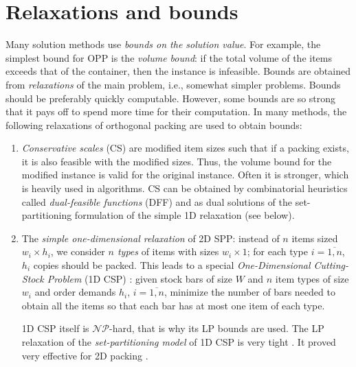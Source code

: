 \documentclass[a4paper,12pt]{article}
\begin{document}
\section{Relaxations and bounds}

Many solution methods use \emph{bounds on the solution value}. For example, the simplest bound for OPP is the \emph{volume bound}: if the total volume of the items exceeds that of the container, then the instance is infeasible.   Bounds are obtained from \emph{relaxations} of the main problem, i.e., somewhat simpler problems. Bounds should be preferably quickly computable. However, some bounds are so strong that it pays off to spend more time for their computation. In many methods, the following relaxations of orthogonal packing are used to obtain bounds:

\begin{enumerate}
\item \emph{Conservative scales} (CS) \cite{FekBnd} are modified item sizes such that if a packing exists, it is also feasible with the modified sizes. Thus, the volume bound for the modified instance is valid for the original instance. Often it is stronger, which is heavily used in algorithms. CS can be obtained by combinatorial heuristics called \emph{dual-feasible functions} (DFF) \cite{FekBnd,ClaDFFSurvey} and as dual solutions \cite{BiD-BiLin} of the set-partitioning formulation of the simple 1D relaxation (see below).

\item The \emph{simple one-dimensional relaxation} of 2D SPP: instead of $n$ items sized $w_i\times h_i$, we consider \emph{$n$ types} of items with sizes $w_i\times1$; for each type $i=\overline{1,n}$, $h_i$ copies should be packed. This leads to a special \emph{One-Dimensional Cutting-Stock Problem} (1D CSP) \cite{Wiki-1DCSP,GG61,AlvesCarvalho08}: given stock bars of size $W$ and $n$ item types of size $w_i$ and order demands $h_i$, $i=\overline{1,n}$, minimize the number of bars needed to obtain all the items so that each bar has at most one item of each type.

1D CSP itself is $\mathcal{NP}$-hard, that is why its LP bounds are used. The LP relaxation of the \emph{set-partitioning model} of 1D CSP is very tight \cite{GG61,RST02}. It proved very effective for 2D packing \cite{Letch03,BiD-BiLin,Baldacci07,BKS07,Roh08}.


\end{enumerate}
\end{document}
